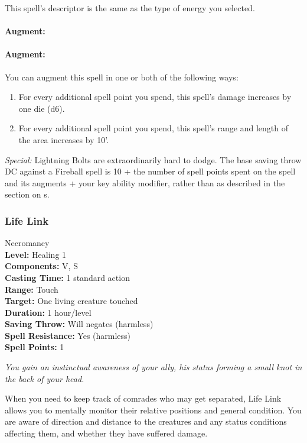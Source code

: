This spell's descriptor is the same as the type of energy you selected. 

\paragraph{Augment:} \paragraph{Augment:} You can augment this spell in one or both of the following ways:
\begin{enumerate}
 \item For every additional spell point you spend, this spell's damage increases by one die (d6).
 \item For every additional spell point you spend, this spell's range and length of the area increases by 10'.
\end{enumerate}

\emph{Special:} Lightning Bolts are extraordinarily hard to dodge. The base saving throw DC against a Fireball spell is 
10 + the number of spell points spent on the spell and its augments + your key ability modifier, 
rather than as described in the section on s.

\subsubsection{Life Link}
\label{Spell:LifeLink}
Necromancy
\\ \textbf{Level:} Healing 1
\\ \textbf{Components:} V, S
\\ \textbf{Casting Time:} 1 standard action
\\ \textbf{Range:} Touch
\\ \textbf{Target:} One living creature touched
\\ \textbf{Duration:} 1 hour/level
\\ \textbf{Saving Throw:} Will negates (harmless)
\\ \textbf{Spell Resistance:} Yes (harmless)
\\ \textbf{Spell Points:} 1

\emph{You gain an instinctual awareness of your ally, his status forming a small knot in the back of your head.}

When you need to keep track of comrades who may get separated, Life Link allows you to mentally monitor their relative positions and general condition. 
You are aware of direction and distance to the creatures and any status conditions affecting them, and whether they have suffered damage.


